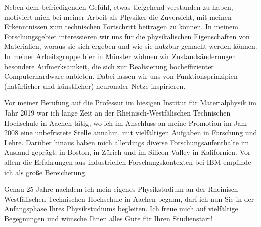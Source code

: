 \begin{multicols}{2}
\begin{multicols}{2}
Neben dem befriedigenden Gefühl, etwas tiefgehend verstanden zu haben, motiviert mich bei meiner Arbeit als Physiker die Zuversicht, mit meinen Erkenntnissen zum technischen Fortschritt beitragen zu können. In meinem Forschungsgebiet interessieren wir uns für die physikalischen Eigenschaften von Materialien, woraus sie sich ergeben und wie sie nutzbar gemacht werden können. In meiner Arbeitsgruppe hier in Münster widmen wir Zustandsänderungen besondere Aufmerksamkeit, die sich zur Realisierung hocheffizienter Computerhardware anbieten. Dabei lassen wir uns von Funktionsprinzipien (natürlicher und künstlicher) neuronaler Netze inspirieren. 

Vor meiner Berufung auf die Professur im hiesigen Institut für Materialphysik im Jahr 2019 war ich lange Zeit an der Rheinisch-Westfälischen Technischen Hochschule in Aachen tätig, wo ich im Anschluss an meine Promotion im Jahr 2008 eine unbefristete Stelle annahm, mit vielfältigen Aufgaben in Forschung und Lehre. Darüber hinaus haben mich allerdings diverse Forschungsaufenthalte im Ausland geprägt; in Boston, in Zürich und im Silicon Valley in Kalifornien. Vor allem die Erfahrungen aus industriellen Forschungskontexten bei IBM empfinde ich als große Bereicherung. 
 
Genau 25 Jahre nachdem ich mein eigenes Physikstudium an der Rheinisch-Westfälischen Technischen Hochschule in Aachen begann, darf ich nun Sie in der Anfangsphase Ihres Physikstudiums begleiten. Ich freue mich auf vielfältige Begegnungen und wünsche Ihnen alles Gute für Ihren Studienstart!


\end{multicols}

\vfill

\newpage


\end{multicols}
